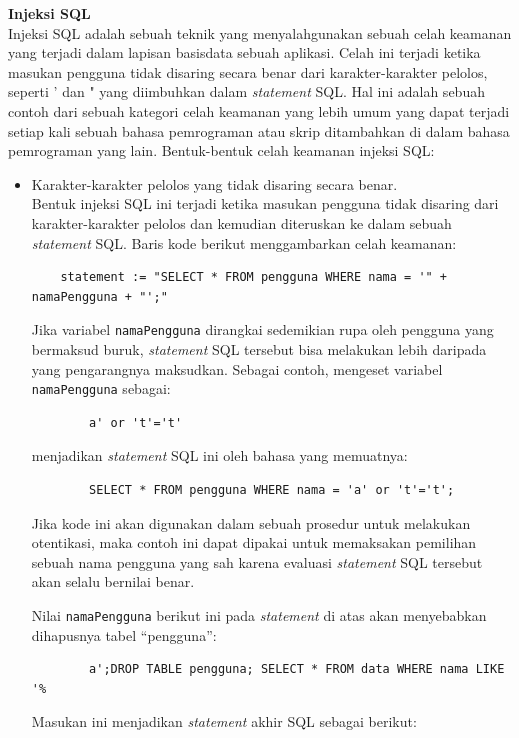 \textbf{Injeksi SQL}\\
Injeksi SQL \cite{injeksi-sql} adalah sebuah teknik yang menyalahgunakan sebuah celah keamanan yang terjadi dalam lapisan basisdata sebuah aplikasi. Celah ini terjadi ketika masukan pengguna tidak disaring secara benar dari karakter-karakter pelolos, seperti ' dan " yang diimbuhkan dalam \textit{statement} SQL. Hal ini adalah sebuah contoh dari sebuah kategori celah keamanan yang lebih umum yang dapat terjadi setiap kali sebuah bahasa pemrograman atau skrip ditambahkan di dalam bahasa pemrograman yang lain. Bentuk-bentuk celah keamanan injeksi SQL:
\begin{itemize}
	\item Karakter-karakter pelolos yang tidak disaring secara benar.\\
	Bentuk injeksi SQL ini terjadi ketika masukan pengguna tidak disaring dari karakter-karakter pelolos dan kemudian diteruskan ke dalam sebuah \textit{statement} SQL. Baris kode berikut menggambarkan celah keamanan:
	\begin{lstlisting}
	statement := "SELECT * FROM pengguna WHERE nama = '" + namaPengguna + "';"
\end{lstlisting}
	
	Jika variabel \verb!namaPengguna! dirangkai sedemikian rupa oleh pengguna yang bermaksud buruk, \textit{statement} SQL tersebut bisa melakukan lebih daripada yang pengarangnya maksudkan. Sebagai contoh, mengeset variabel \verb!namaPengguna! sebagai:
	\begin{lstlisting}
		a' or 't'='t'
	\end{lstlisting}
	menjadikan \textit{statement} SQL ini oleh bahasa yang memuatnya:
	\begin{lstlisting}
		SELECT * FROM pengguna WHERE nama = 'a' or 't'='t';
	\end{lstlisting}
	Jika kode ini akan digunakan dalam sebuah prosedur untuk melakukan otentikasi, maka contoh ini dapat dipakai untuk memaksakan pemilihan sebuah nama pengguna yang sah karena evaluasi \textit{statement} SQL tersebut akan selalu bernilai benar.
	
	 Nilai \verb!namaPengguna! berikut ini pada \textit{statement} di atas akan menyebabkan dihapusnya tabel ``pengguna'':
	 
	\begin{lstlisting}
		a';DROP TABLE pengguna; SELECT * FROM data WHERE nama LIKE '%
	\end{lstlisting}
	
	Masukan ini menjadikan \textit{statement} akhir SQL sebagai berikut:


\end{itemize}
